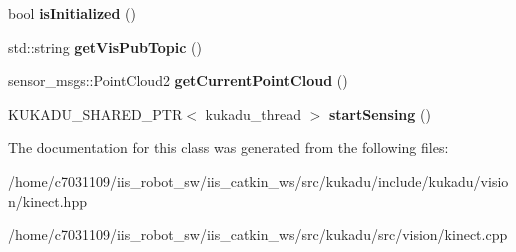 \begin{DoxyCompactItemize}
\item 
\hypertarget{classkukadu_1_1Kinect_a7ae4121c9bb011af3d3c7f46165959e2}{bool {\bfseries is\-Initialized} ()}\label{classkukadu_1_1Kinect_a7ae4121c9bb011af3d3c7f46165959e2}

\item 
\hypertarget{classkukadu_1_1Kinect_a52f8d2b28a3b994500a5786e3dba5cab}{std\-::string {\bfseries get\-Vis\-Pub\-Topic} ()}\label{classkukadu_1_1Kinect_a52f8d2b28a3b994500a5786e3dba5cab}

\item 
\hypertarget{classkukadu_1_1Kinect_a6fb5ba75135ca2744473642a9798df67}{sensor\-\_\-msgs\-::\-Point\-Cloud2 {\bfseries get\-Current\-Point\-Cloud} ()}\label{classkukadu_1_1Kinect_a6fb5ba75135ca2744473642a9798df67}

\item 
\hypertarget{classkukadu_1_1Kinect_accb63ddb5e6024124d575e7fe229c429}{K\-U\-K\-A\-D\-U\-\_\-\-S\-H\-A\-R\-E\-D\-\_\-\-P\-T\-R$<$ kukadu\-\_\-thread $>$ {\bfseries start\-Sensing} ()}\label{classkukadu_1_1Kinect_accb63ddb5e6024124d575e7fe229c429}

\end{DoxyCompactItemize}


The documentation for this class was generated from the following files\-:\begin{DoxyCompactItemize}
\item 
/home/c7031109/iis\-\_\-robot\-\_\-sw/iis\-\_\-catkin\-\_\-ws/src/kukadu/include/kukadu/vision/kinect.\-hpp\item 
/home/c7031109/iis\-\_\-robot\-\_\-sw/iis\-\_\-catkin\-\_\-ws/src/kukadu/src/vision/kinect.\-cpp\end{DoxyCompactItemize}
